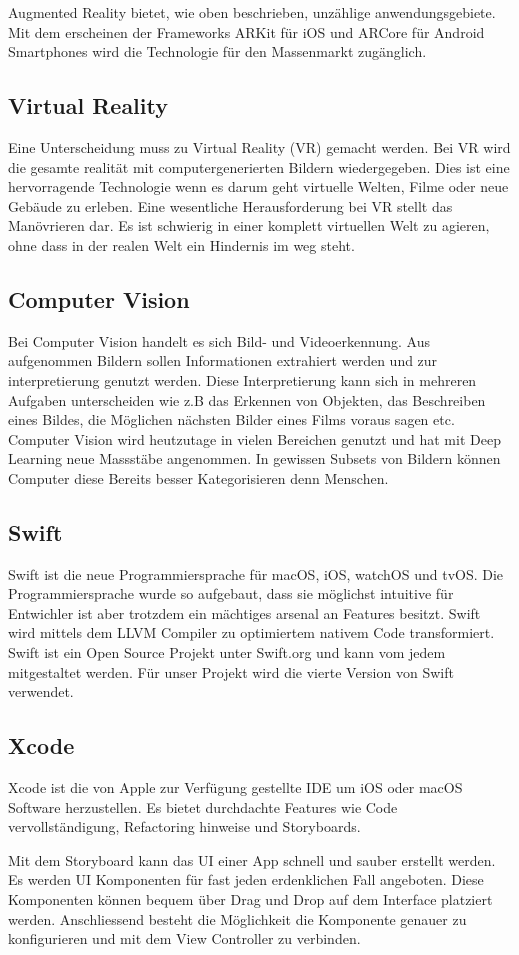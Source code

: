 Augmented Reality bietet, wie oben beschrieben, unzählige anwendungsgebiete. Mit dem erscheinen der Frameworks ARKit für iOS und ARCore für Android Smartphones wird die Technologie für den Massenmarkt zugänglich.

\subsection{Virtual Reality} \label{sub:virtual-reality}
Eine Unterscheidung muss zu Virtual Reality (VR) gemacht werden. Bei VR wird die gesamte realität mit computergenerierten Bildern wiedergegeben. Dies ist eine hervorragende Technologie wenn es darum geht virtuelle Welten, Filme oder neue Gebäude zu erleben. Eine wesentliche Herausforderung bei VR stellt das Manövrieren dar. Es ist schwierig in einer komplett virtuellen Welt zu agieren, ohne dass in der realen Welt ein Hindernis im weg steht.

\subsection{Computer Vision} \label{sub:computer-vision}
Bei Computer Vision handelt es sich Bild- und Videoerkennung. Aus aufgenommen Bildern sollen Informationen extrahiert werden und zur interpretierung genutzt werden. Diese Interpretierung kann sich in mehreren Aufgaben unterscheiden wie z.B das Erkennen von Objekten, das Beschreiben eines Bildes, die Möglichen nächsten Bilder eines Films voraus sagen etc. Computer Vision wird heutzutage in vielen Bereichen genutzt und hat mit Deep Learning neue Massstäbe angenommen. In gewissen Subsets von Bildern können Computer diese Bereits besser Kategorisieren denn Menschen.

\subsection{Swift}
Swift ist die neue Programmiersprache für macOS, iOS, watchOS und tvOS. Die Programmiersprache wurde so aufgebaut, dass sie möglichst intuitive für Entwichler ist aber trotzdem ein mächtiges arsenal an Features besitzt. Swift wird mittels dem LLVM Compiler zu optimiertem nativem Code transformiert. Swift ist ein Open Source Projekt unter Swift.org und kann vom jedem mitgestaltet werden. Für unser Projekt wird die vierte Version von Swift verwendet.


\subsection{Xcode}
Xcode ist die von Apple zur Verfügung gestellte IDE um iOS oder macOS Software herzustellen. Es bietet durchdachte Features wie Code vervollständigung, Refactoring hinweise und Storyboards.

Mit dem Storyboard kann das UI einer App schnell und sauber erstellt werden. Es werden UI Komponenten für fast jeden erdenklichen Fall angeboten. Diese Komponenten können bequem über Drag und Drop auf dem Interface platziert werden. Anschliessend besteht die Möglichkeit die Komponente genauer zu konfigurieren und mit dem View Controller zu verbinden.
